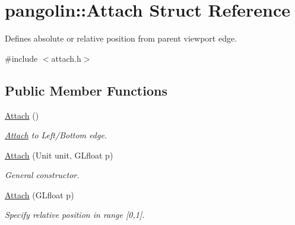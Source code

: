 \hypertarget{structpangolin_1_1_attach}{}\section{pangolin\+:\+:Attach Struct Reference}
\label{structpangolin_1_1_attach}


Defines absolute or relative position from parent viewport edge.  




{\ttfamily \#include $<$attach.\+h$>$}

\subsection*{Public Member Functions}
\begin{DoxyCompactItemize}
\item 
\hyperlink{structpangolin_1_1_attach_ad6435a933587d3de2f985a1127b6a391}{Attach} ()\hypertarget{structpangolin_1_1_attach_ad6435a933587d3de2f985a1127b6a391}{}\label{structpangolin_1_1_attach_ad6435a933587d3de2f985a1127b6a391}

\begin{DoxyCompactList}\small\item\em \hyperlink{structpangolin_1_1_attach}{Attach} to Left/\+Bottom edge. \end{DoxyCompactList}\item 
\hyperlink{structpangolin_1_1_attach_a034b010543263315700e65ca2b3eb258}{Attach} (Unit unit, G\+Lfloat p)\hypertarget{structpangolin_1_1_attach_a034b010543263315700e65ca2b3eb258}{}\label{structpangolin_1_1_attach_a034b010543263315700e65ca2b3eb258}

\begin{DoxyCompactList}\small\item\em General constructor. \end{DoxyCompactList}\item 
\hyperlink{structpangolin_1_1_attach_accf5a60bc3375656fb5be274cd537934}{Attach} (G\+Lfloat p)
\begin{DoxyCompactList}\small\item\em Specify relative position in range \mbox{[}0,1\mbox{]}. \end{DoxyCompactList}\end{DoxyCompactItemize}
